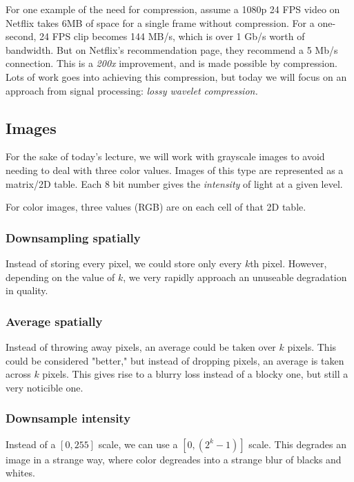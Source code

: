 \documentclass[titlepage, 12pt, leqno]{article}
\begin{document}
For one example of the need for compression, assume a 1080p 24 FPS video on
Netflix takes 6MB of space for a single frame without compression. For a
one-second, 24 FPS clip becomes 144 MB/s, which is over 1 Gb/s worth of
bandwidth. But on Netflix's recommendation page, they recommend a 5 Mb/s
connection. This is a \textit{200x} improvement, and is made possible by
compression. Lots of work goes into achieving this compression, but today we will
focus on an approach from signal processing: \textit{lossy wavelet compression.}

\subsection{Images}
For the sake of today's lecture, we will work with grayscale images to avoid 
needing to deal with three color values. Images of this type are represented as
a matrix/2D table. Each 8 bit number gives the \textit{intensity} of light at a
given level.

\begin{note}
    For color images, three values (RGB) are on each cell of that 2D table.
\end{note}

\subsubsection{Downsampling spatially}
Instead of storing every pixel, we could store only every $k$th pixel. However,
depending on the value of $k$, we very rapidly approach an unuseable degradation
in quality.

\subsubsection{Average spatially}
Instead of throwing away pixels, an average could be taken over $k$ pixels. This
could be considered "better," but instead of dropping pixels, an average is taken
across $k$ pixels. This gives rise to a blurry loss instead of a blocky one, but
still a very noticible one.

\subsubsection{Downsample intensity}
Instead of a $[0,255]$ scale, we can use a $[0, (2^{k}-1)]$ scale. This degrades
an image in a strange way, where color degreades into a strange blur of blacks
and whites.
\end{document}
